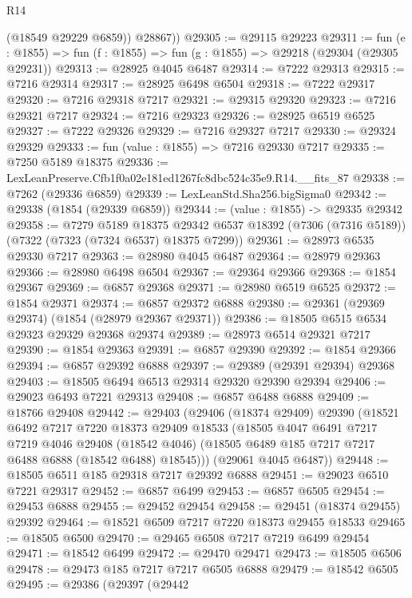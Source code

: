 \begin{lexlean}{R14}
\begin{coremodule}
          (@18549 @29229 @6859))
        @28867))
@29305 := @29115 @29223
@29311 := fun (e : @1855) => fun (f : @1855) => fun (g : @1855) => @29218 (@29304 (@29305 @29231))
@29313 := @28925 @4045 @6487
@29314 := @7222 @29313
@29315 := @7216 @29314
@29317 := @28925 @6498 @6504
@29318 := @7222 @29317
@29320 := @7216 @29318 @7217
@29321 := @29315 @29320
@29323 := @7216 @29321 @7217
@29324 := @7216 @29323
@29326 := @28925 @6519 @6525
@29327 := @7222 @29326
@29329 := @7216 @29327 @7217
@29330 := @29324 @29329
@29333 := fun (value : @1855) => @7216 @29330 @7217
@29335 := @7250 @5189 @18375
@29336 := LexLeanPreserve.Cfb1f0a02e181ed1267fc8dbc524c35e9.R14.__fits_87
@29338 := @7262 (@29336 @6859)
@29339 := LexLeanStd.Sha256.bigSigma0
@29342 := @29338 (@1854 (@29339 @6859))
@29344 := (value : @1855) -> @29335 @29342
@29358 := @7279
    @5189
    @18375
    @29342
    @6537
    @18392
    (@7306 (@7316 @5189))
    (@7322 (@7323 (@7324 @6537) @18375 @7299))
@29361 := @28973 @6535 @29330 @7217
@29363 := @28980 @4045 @6487
@29364 := @28979 @29363
@29366 := @28980 @6498 @6504
@29367 := @29364 @29366
@29368 := @1854 @29367
@29369 := @6857 @29368
@29371 := @28980 @6519 @6525
@29372 := @1854 @29371
@29374 := @6857 @29372 @6888
@29380 := @29361 (@29369 @29374) (@1854 (@28979 @29367 @29371))
@29386 := @18505 @6515 @6534 @29323 @29329 @29368 @29374
@29389 := @28973 @6514 @29321 @7217
@29390 := @1854 @29363
@29391 := @6857 @29390
@29392 := @1854 @29366
@29394 := @6857 @29392 @6888
@29397 := @29389 (@29391 @29394) @29368
@29403 := @18505 @6494 @6513 @29314 @29320 @29390 @29394
@29406 := @29023 @6493 @7221 @29313
@29408 := @6857 @6488 @6888
@29409 := @18766 @29408
@29442 := @29403
    (@29406
      (@18374 @29409)
      @29390
      (@18521
        @6492
        @7217
        @7220
        @18373
        @29409
        @18533
        (@18505
          @4047
          @6491
          @7217
          @7219
          @4046
          @29408
          (@18542 @4046)
          (@18505 @6489 @185 @7217 @7217 @6488 @6888 (@18542 @6488) @18545)))
      (@29061 @4045 @6487))
@29448 := @18505 @6511 @185 @29318 @7217 @29392 @6888
@29451 := @29023 @6510 @7221 @29317
@29452 := @6857 @6499
@29453 := @6857 @6505
@29454 := @29453 @6888
@29455 := @29452 @29454
@29458 := @29451 (@18374 @29455) @29392
@29464 := @18521 @6509 @7217 @7220 @18373 @29455 @18533
@29465 := @18505 @6500
@29470 := @29465 @6508 @7217 @7219 @6499 @29454
@29471 := @18542 @6499
@29472 := @29470 @29471
@29473 := @18505 @6506
@29478 := @29473 @185 @7217 @7217 @6505 @6888
@29479 := @18542 @6505
@29495 := @29386
    (@29397
      (@29442

\end{coremodule}
\end{lexlean}
